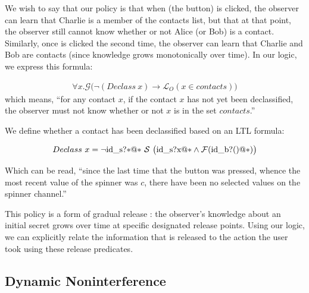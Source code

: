 \documentclass[conference]{IEEEtran}
\newcommand{\code}[1]{\text{\lstinline!#1!}}
\theoremstyle{definition}
\newcommand{\prin}{\textit{O}}
\newcommand{\talways}{\mathcal{G}}
\newcommand{\tfuture}{\mathcal{F}}
\newcommand{\tsince}{~\mathcal{S}~}
\newcommand{\tpossible}[1]{\mathcal{L}_{#1}}
\begin{document}
We wish to say that our policy is that when \code{id\_b} (the button)
is clicked, the observer can learn that Charlie is a member of the
contacts list, but that at that point, the observer still cannot know
whether or not Alice (or Bob) is a contact.  Similarly, once
\code{id\_b} is clicked the second time, the observer can learn that
Charlie and Bob are contacts (since knowledge grows monotonically over
time).  In our logic, we express this formula:

\begin{displaymath}
  \begin{array}{c}
    \forall x. \talways \big( \lnot (Declass~x) \rightarrow \tpossible{\prin} (x \in contacts) \big)
  \end{array}
\end{displaymath}
which means, ``for any contact $x$, if the contact $x$ has not yet
been declassified, the observer must not know whether or not $x$ is in the
set $contacts$.''

We define whether a contact has been declassified based on an LTL formula:

\begin{displaymath}
  \begin{array}{c}
    Declass~x =  \lnot \code{id\_s?*@*} \tsince \big(
    \code{id\_s?x@*} \land \tfuture (\code{id\_b?()@*}) \big)
  \end{array}
\end{displaymath}

Which can be read, ``since the last time that the button was pressed,
whence the most recent value of the spinner was $c$, there have been
no selected values on the spinner channel.''

This policy is a form of gradual release \cite{Askarov:2007}: the
observer's knowledge about an initial secret grows over time at
specific designated release points.  Using our logic, we can
explicitly relate the information that is released to the action the
user took using these release predicates.


\subsection{Dynamic Noninterference}
\end{document}
